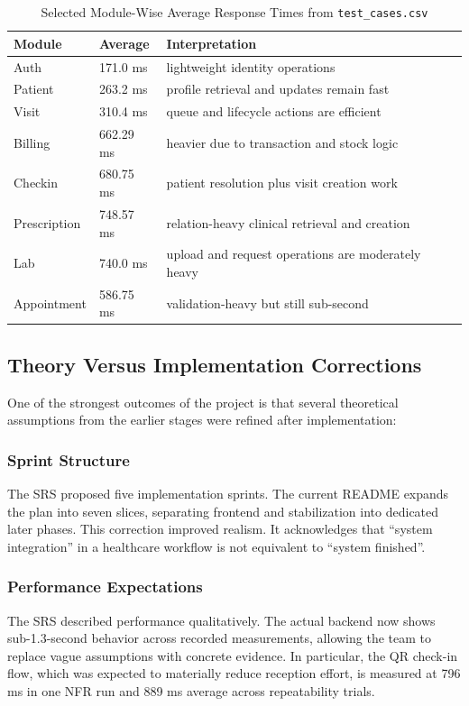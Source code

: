 \documentclass[conference]{IEEEtran}
\begin{document}
\begin{table}[!t]
\centering
\caption{Selected Module-Wise Average Response Times from \texttt{test\_cases.csv}}
\begin{tabular}{|p{2.2cm}|p{1.4cm}|p{2.7cm}|}
\hline
\textbf{Module} & \textbf{Average} & \textbf{Interpretation} \\
\hline
Auth & 171.0 ms & lightweight identity operations \\
\hline
Patient & 263.2 ms & profile retrieval and updates remain fast \\
\hline
Visit & 310.4 ms & queue and lifecycle actions are efficient \\
\hline
Billing & 662.29 ms & heavier due to transaction and stock logic \\
\hline
Checkin & 680.75 ms & patient resolution plus visit creation work \\
\hline
Prescription & 748.57 ms & relation-heavy clinical retrieval and creation \\
\hline
Lab & 740.0 ms & upload and request operations are moderately heavy \\
\hline
Appointment & 586.75 ms & validation-heavy but still sub-second \\
\hline
\end{tabular}
\label{tab:moduleavg}
\end{table}

\subsection{Theory Versus Implementation Corrections}
One of the strongest outcomes of the project is that several theoretical assumptions from the earlier stages were refined after implementation:

\subsubsection{Sprint Structure}
The SRS proposed five implementation sprints. The current README expands the plan into seven slices, separating frontend and stabilization into dedicated later phases. This correction improved realism. It acknowledges that ``system integration'' in a healthcare workflow is not equivalent to ``system finished''.

\subsubsection{Performance Expectations}
The SRS described performance qualitatively. The actual backend now shows sub-1.3-second behavior across recorded measurements, allowing the team to replace vague assumptions with concrete evidence. In particular, the QR check-in flow, which was expected to materially reduce reception effort, is measured at 796 ms in one NFR run and 889 ms average across repeatability trials.
\end{document}
